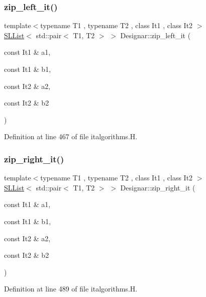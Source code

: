 \mbox{\label{namespace_designar_aba3b0205f205231f2b7c8df5637b4752}} 
\subsubsection{\texorpdfstring{zip\+\_\+left\+\_\+it()}{zip\_left\_it()}}
{\footnotesize\ttfamily template$<$typename T1 , typename T2 , class It1 , class It2 $>$ \\
\hyperlink{class_designar_1_1_s_l_list}{S\+L\+List}$<$ std\+::pair$<$ T1, T2 $>$ $>$ Designar\+::zip\+\_\+left\+\_\+it (\begin{DoxyParamCaption}\item[{const It1 \&}]{a1,  }\item[{const It1 \&}]{b1,  }\item[{const It2 \&}]{a2,  }\item[{const It2 \&}]{b2 }\end{DoxyParamCaption})}



Definition at line 467 of file italgorithms.\+H.

\mbox{\label{namespace_designar_a6461340f34943ba69a52a427a97e7140}} 
\subsubsection{\texorpdfstring{zip\+\_\+right\+\_\+it()}{zip\_right\_it()}}
{\footnotesize\ttfamily template$<$typename T1 , typename T2 , class It1 , class It2 $>$ \\
\hyperlink{class_designar_1_1_s_l_list}{S\+L\+List}$<$ std\+::pair$<$ T1, T2 $>$ $>$ Designar\+::zip\+\_\+right\+\_\+it (\begin{DoxyParamCaption}\item[{const It1 \&}]{a1,  }\item[{const It1 \&}]{b1,  }\item[{const It2 \&}]{a2,  }\item[{const It2 \&}]{b2 }\end{DoxyParamCaption})}



Definition at line 489 of file italgorithms.\+H.



